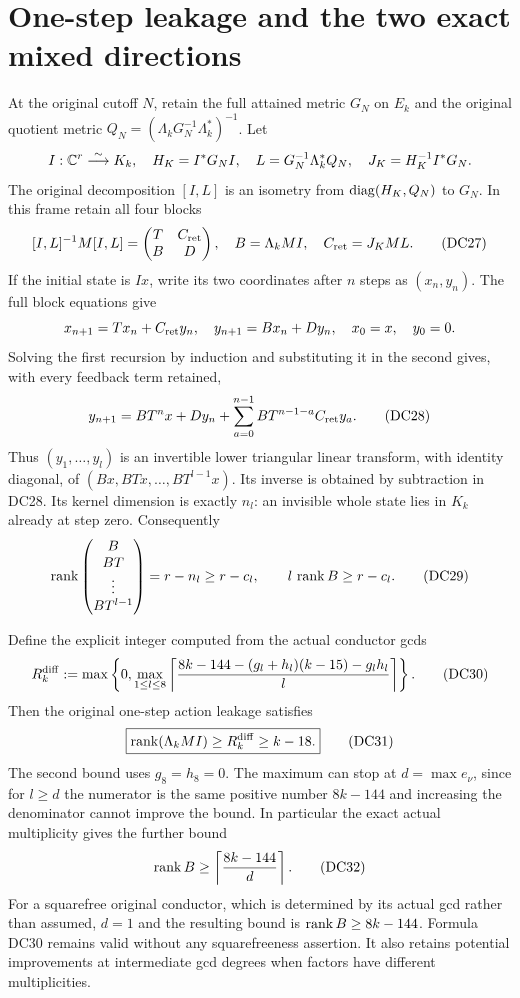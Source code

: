 \documentclass[11pt]{article}
\begin{document}
\section{One-step leakage and the two exact mixed directions}
At the original cutoff $N$, retain the full attained metric $G_N$ on
$E_k$ and the original quotient metric
$Q_N=(\Lambda_kG_N^{-1}\Lambda_k^*)^{-1}$.  Let
\[
 I:\mathbb C^r\overset{\sim}{\longrightarrow}K_k,\quad
 H_K=I^*G_NI,\quad L=G_N^{-1}\Lambda_k^*Q_N,
 \quad J_K=H_K^{-1}I^*G_N.
\]
The original decomposition $[I,L]$ is an isometry from
$\operatorname{diag}(H_K,Q_N)$ to $G_N$.  In this frame retain all four blocks
\[
 [I,L]^{-1}M[I,L]=\begin{pmatrix}T&C_{\rm ret}\\B&D\end{pmatrix},
 \quad B=\Lambda_kMI,\quad C_{\rm ret}=J_KML.                    \tag{DC27}
\]
If the initial state is $Ix$, write its two coordinates after $n$
steps as $(x_n,y_n)$.  The full block equations give
\[
 x_{n+1}=Tx_n+C_{\rm ret}y_n,\quad
 y_{n+1}=Bx_n+Dy_n,\quad x_0=x,\quad y_0=0.
\]
Solving the first recursion by induction and substituting it in the
second gives, with every feedback term retained,
\[
 y_{n+1}=BT^nx+Dy_n+
            \sum_{a=0}^{n-1}BT^{n-1-a}C_{\rm ret}y_a.           \tag{DC28}
\]
Thus $(y_1,\ldots,y_l)$ is an invertible lower triangular linear
transform, with identity diagonal, of
$(Bx,BTx,\ldots,BT^{l-1}x)$.  Its inverse is obtained by subtraction
in DC28.  Its kernel dimension is exactly $n_l$: an invisible whole
state lies in $K_k$ already at step zero.  Consequently
\[
 \operatorname{rank}\begin{pmatrix}B\\BT\\\vdots\\BT^{l-1}\end{pmatrix}
   =r-n_l\ge r-c_l,\qquad
 l\,\operatorname{rank} B\ge r-c_l.                                           \tag{DC29}
\]

Define the explicit integer computed from the actual conductor gcds
\[
 R_k^{\rm diff}:=
 \max\left\{0,\max_{1\le l\le8}
 \left\lceil\frac{8k-144-(g_l+h_l)(k-15)-g_lh_l}{l}\right\rceil
                                                    \right\}.
                                                                    \tag{DC30}
\]
Then the original one-step action leakage satisfies
\[
 \boxed{\operatorname{rank}(\Lambda_kMI)\ge R_k^{\rm diff}\ge k-18.}          \tag{DC31}
\]
The second bound uses $g_8=h_8=0$.  The maximum can stop at
$d=\max e_\nu$, since for $l\ge d$ the numerator is the same
positive number $8k-144$ and increasing the denominator cannot
improve the bound.  In particular the exact actual multiplicity
gives the further bound
\[
 \operatorname{rank} B\ge\left\lceil\frac{8k-144}{d}\right\rceil.             \tag{DC32}
\]
For a squarefree original conductor, which is determined by its
actual gcd rather than assumed, $d=1$ and the resulting bound is
$\operatorname{rank} B\ge8k-144$.  Formula DC30 remains valid without any
squarefreeness assertion.  It also retains potential improvements
at intermediate gcd degrees when factors have different multiplicities.
\end{document}
